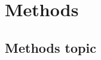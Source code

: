 \newpage
\section{Methods}

\lipsum[5]

\lipsum[5]

\lipsum[5]

\subsection{Methods topic}

\lipsum[5]

\lipsum[5]